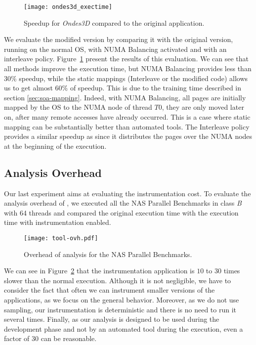\begin{figure}[!t]
    \centering
    \texttt{[image: ondes3d\_exectime]}
    \caption{Speedup for \emph{Ondes3D} compared to the original application.}
\label{fig:ondes-res}
\end{figure}

We evaluate the modified version by comparing it with the original
version, running on the normal OS, with NUMA Balancing activated and with an
interleave policy. Figure~\ref{fig:ondes-res} present the results of this
evaluation. We can see that all methods improve the execution time, but
NUMA Balancing provides less than $30\%$ speedup, while the static mappings
(Interleave or the modified code) allows us to get almost $60\%$ of speedup. This is
due to the training time described in section \ref{sec:soa-mapping}. Indeed,
with NUMA Balancing, all pages are initially mapped by the OS to the NUMA node of thread $T0$, they
are only moved later on, after many remote accesses have already occurred. This is a case where static mapping can be substantially better than automated
tools. The Interleave policy provides a similar speedup as
\TABARNAC since it distributes the pages over the NUMA nodes at the beginning of
the execution.

\subsection{Analysis Overhead}
\label{sec:expe-overhead}

Our last experiment aims at evaluating the instrumentation cost. To evaluate the analysis overhead of \TABARNAC, we
executed all the NAS Parallel Benchmarks in class \emph{B} with 64 threads and compared
the original execution time with the execution time with instrumentation enabled.

\begin{figure}[!t]
    \centering
    \texttt{[image: tool-ovh.pdf]}
    \caption{Overhead of \TABARNAC analysis for the NAS Parallel Benchmarks.}
    \label{fig:ovh}
\end{figure}


We can see in Figure~\ref{fig:ovh} that
the instrumentation application is $10$ to $30$ times slower than the normal execution. Although it is
not negligible, we have to consider the fact that often we can instrument
smaller versions of the applications, as we focus on the general behavior.
Moreover, as we do not use sampling, our instrumentation is deterministic and
there is no need to run it several times. Finally, as our
analysis is designed to be used during the development phase and not by an automated tool during the execution, even a factor of $30$
can be reasonable.

